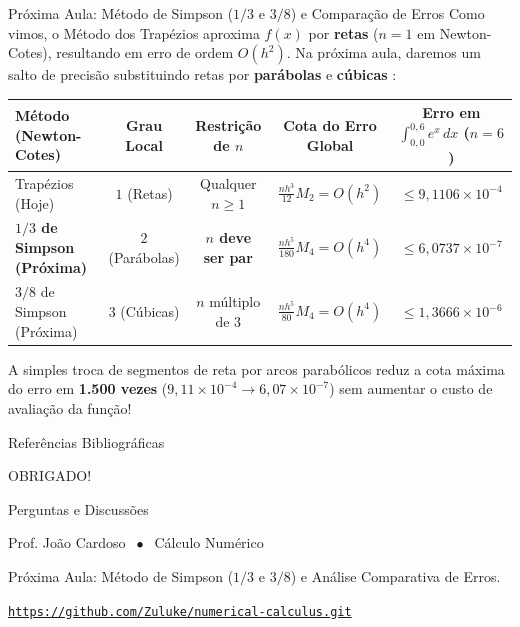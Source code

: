 \documentclass[aspectratio=169]{beamer}
\newcommand{\highlight}[1]{\textcolor{primary}{\textbf{#1}}}
\begin{document}
\begin{frame}{Próxima Aula: Método de Simpson ($1/3$ e $3/8$) e Comparação de Erros}
\footnotesize
Como vimos, o Método dos Trapézios aproxima $f(x)$ por \textbf{retas} ($n=1$ em Newton-Cotes), resultando em erro de ordem $O(h^2)$. Na próxima aula, daremos um salto de precisão substituindo retas por \highlight{parábolas} e \highlight{cúbicas} \cite{santos2010, mesquita2026, burden2016}:

\begin{center}
\begin{tabular}{lcccc}
\toprule
\textbf{Método (Newton-Cotes)} & \textbf{Grau Local} & \textbf{Restrição de $n$} & \textbf{Cota do Erro Global} & \textbf{Erro em $\int_{0{,}0}^{0{,}6} e^x\,dx$ ($n=6$)} \\
\midrule
Trapézios (Hoje) & $1$ (Retas) & Qualquer $n \ge 1$ & $\frac{n h^3}{12} M_2 = O(h^2)$ & $\le 9{,}1106 \times 10^{-4}$ \\
\rowcolor{primary!10}
\textbf{$1/3$ de Simpson (Próxima)} & $2$ (Parábolas) & \textbf{$n$ deve ser par} & $\frac{n h^5}{180} M_4 = O(h^4)$ & $\le 6{,}0737 \times 10^{-7}$ \\
$3/8$ de Simpson (Próxima) & $3$ (Cúbicas) & $n$ múltiplo de $3$ & $\frac{n h^5}{80} M_4 = O(h^4)$ & $\le 1{,}3666 \times 10^{-6}$ \\
\bottomrule
\end{tabular}
\end{center}
\vspace{0.15cm}
\begin{bee}
A simples troca de segmentos de reta por arcos parabólicos reduz a cota máxima do erro em \highlight{1.500 vezes} ($9{,}11\times 10^{-4} \rightarrow 6{,}07\times 10^{-7}$) sem aumentar o custo de avaliação da função!
\end{bee}
\end{frame}

\begin{frame}[allowframebreaks]{Referências Bibliográficas}
\nocite{*}
\printbibliography
\end{frame}

\begin{frame}
    \centerline{\Huge OBRIGADO!}
    \vspace{0.5cm}
    \centerline{\Large Perguntas e Discussões}
    \vspace{0.3cm}
    \centerline{\small Prof. João Cardoso $\;\bullet\;$ Cálculo Numérico}
    \vspace{0.2cm}
    \centerline{\footnotesize Próxima Aula: Método de Simpson ($1/3$ e $3/8$) e Análise Comparativa de Erros.}
    \vspace{0.25cm}
    \centerline{\tiny \href{https://github.com/Zuluke/numerical-calculus.git}{\nolinkurl{https://github.com/Zuluke/numerical-calculus.git}}}
\end{frame}
\end{document}

